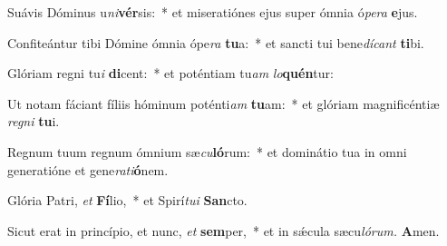 \item Suávis Dóminus u\textit{ni}\textbf{vér}sis:~* et miseratiónes ejus super ómnia ó\textit{pera} \textbf{e}jus.
\item Confiteántur tibi Dómine ómnia ópe\textit{ra} \textbf{tu}a:~* et sancti tui bene\tinyhspace\textit{dícant} \textbf{ti}bi.
\item Glóriam regni tu\textit{i} \textbf{di}cent:~* et poténtiam tu\textit{am} \textit{lo}\textbf{quén}tur:
\item Ut notam fáciant fíliis hóminum poténti\textit{am} \textbf{tu}am:~* et glóriam magnificéntiæ \textit{regni} \textbf{tu}i.
\item Regnum tuum regnum ómnium sæ\textit{cu}\textbf{ló}rum:~* et dominátio tua in omni generatióne et gene\textit{rati}\textbf{ó}nem.
\item Glória Patri, \textit{et} \textbf{Fí}lio,~* et Spirí\tinyhspace\textit{tui} \textbf{San}cto.
\item Sicut erat in princípio, et nunc, \textit{et} \textbf{sem}per,~* et in sǽcula sæcu\tinyhspace\textit{lórum.} \textbf{A}men.